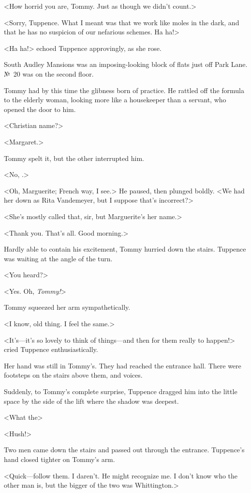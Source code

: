 <How horrid you are, Tommy. Just as though we didn't count.>

<Sorry, Tuppence. What I meant was that we work like moles in the dark, and that he has no suspicion of our nefarious schemes. Ha ha!>

<Ha ha!> echoed Tuppence approvingly, as she rose.

South Audley Mansions was an imposing-looking block of flats just off Park Lane. №~20 was on the second floor.

Tommy had by this time the glibness born of practice. He rattled off the formula to the elderly woman, looking more like a housekeeper than a servant, who opened the door to him.

<Christian name?>

<Margaret.>

Tommy spelt it, but the other interrupted him.

<No, .>

<Oh, Marguerite; French way, I see.> He paused, then plunged boldly. <We had her down as Rita Vandemeyer, but I suppose that's incorrect?>

<She's mostly called that, sir, but Marguerite's her name.>

<Thank you. That's all. Good morning.>

Hardly able to contain his excitement, Tommy hurried down the stairs. Tuppence was waiting at the angle of the turn.

<You heard?>

<Yes. Oh, \emph{Tommy!}>

Tommy squeezed her arm sympathetically.

<I know, old thing. I feel the same.>

<It's—it's so lovely to think of things—and then for them really to happen!> cried Tuppence enthusiastically.

Her hand was still in Tommy's. They had reached the entrance hall. There were footsteps on the stairs above them, and voices.

Suddenly, to Tommy's complete surprise, Tuppence dragged him into the little space by the side of the lift where the shadow was deepest.

<What the\longdash>

<Hush!>

Two men came down the stairs and passed out through the entrance. Tuppence's hand closed tighter on Tommy's arm.

<Quick—follow them. I daren't. He might recognize me. I don't know who the other man is, but the bigger of the two was Whittington.> 